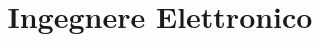 \documentclass[10pt,a4paper,sans]{moderncv}
\title{Ingegnere Elettronico}
\begin{document}
  \makecvtitle

  
  
  
  

  \pagebreak

  
  
  
\end{document}
